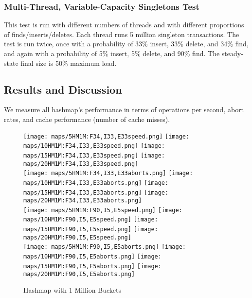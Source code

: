 \subsubsection{Multi-Thread, Variable-Capacity Singletons Test} 
This test is run with different numbers of threads and with different proportions of finds/inserts/deletes. Each thread runs 5 million singleton transactions.
The test is run twice, once with a probability of 33\% insert, 33\% delete, and 34\% find, and again with a probability of 5\% insert, 5\% delete, and 90\% find. The steady-state final size is 50\% maximum load.

\subsection{Results and Discussion}

We measure all hashmap's performance in terms of operations per second, abort rates, and cache performance (number of cache misses). 

\begin{figure}[h!]
    \centering
    \texttt{[image: maps/5HM1M:F34,I33,E33speed.png]}
    \texttt{[image: maps/10HM1M:F34,I33,E33speed.png]}
    \texttt{[image: maps/15HM1M:F34,I33,E33speed.png]}
    \texttt{[image: maps/20HM1M:F34,I33,E33speed.png]}
    \\
    \texttt{[image: maps/5HM1M:F34,I33,E33aborts.png]}
    \texttt{[image: maps/10HM1M:F34,I33,E33aborts.png]}
    \texttt{[image: maps/15HM1M:F34,I33,E33aborts.png]}
    \texttt{[image: maps/20HM1M:F34,I33,E33aborts.png]}
    \\
    \texttt{[image: maps/5HM1M:F90,I5,E5speed.png]}
    \texttt{[image: maps/10HM1M:F90,I5,E5speed.png]}
    \texttt{[image: maps/15HM1M:F90,I5,E5speed.png]}
    \texttt{[image: maps/20HM1M:F90,I5,E5speed.png]}
    \\
    \texttt{[image: maps/5HM1M:F90,I5,E5aborts.png]}
    \texttt{[image: maps/10HM1M:F90,I5,E5aborts.png]}
    \texttt{[image: maps/15HM1M:F90,I5,E5aborts.png]}
    \texttt{[image: maps/20HM1M:F90,I5,E5aborts.png]}
\caption{Hashmap with 1 Million Buckets}
\label{fig:ntqueues}
\end{figure}

